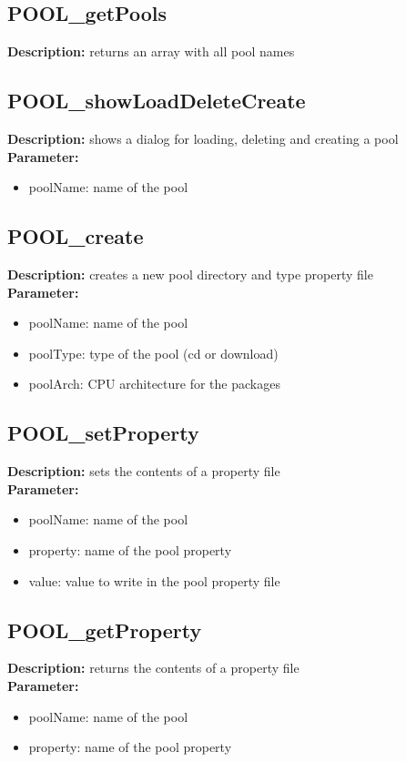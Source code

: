 \subsection{POOL\_getPools}
\textbf{Description:} returns an array with all pool names\\

\subsection{POOL\_showLoadDeleteCreate}
\textbf{Description:} shows a dialog for loading, deleting and creating a pool\\
\textbf{Parameter:}
\begin{itemize}
\item poolName: name of the pool
\end{itemize}

\subsection{POOL\_create}
\textbf{Description:} creates a new pool directory and type property file\\
\textbf{Parameter:}
\begin{itemize}
\item poolName: name of the pool
\item poolType: type of the pool (cd or download)
\item poolArch: CPU architecture for the packages
\end{itemize}

\subsection{POOL\_setProperty}
\textbf{Description:} sets the contents of a property file\\
\textbf{Parameter:}
\begin{itemize}
\item poolName: name of the pool
\item property: name of the pool property
\item value: value to write in the pool property file
\end{itemize}

\subsection{POOL\_getProperty}
\textbf{Description:} returns the contents of a property file\\
\textbf{Parameter:}
\begin{itemize}
\item poolName: name of the pool
\item property: name of the pool property
\end{itemize}

